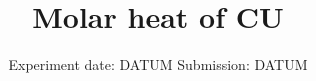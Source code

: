 

\subject{V47}
\title{Molar heat of CU}
\date{
  Experiment date: DATUM
  \hspace{3em}
  Submission: DATUM
}



\maketitle
\thispagestyle{empty}
\tableofcontents
\newpage
\setcounter{page}{1}



%



\newpage
\printbibliography
\nocite{ap47}
\nocite{matplotlib}
\nocite{numpy}
\nocite{scipy}
\nocite{uncertainties}
\nocite{reback2020pandas}

\newpage
%
%


